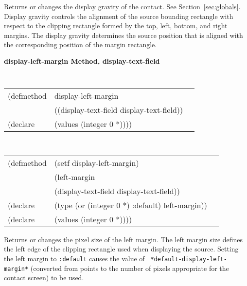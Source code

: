 \begin{flushright} \parbox[t]{6.125in}{
Returns or changes the display gravity of the contact.
See Section~\ref{sec:globals}. Display gravity controls the alignment of the
source bounding rectangle with respect to the clipping rectangle formed by the
top, left, bottom, and right margins. The display gravity determines the source
position that is aligned with the corresponding position of the margin
rectangle.  
} \end{flushright}

{\samepage  
{\large {\bf display-left-margin \hfill Method, display-text-field}}
\begin{flushright} \parbox[t]{6.125in}{
\tt
\begin{tabular}{lll}
\raggedright
(defmethod & display-left-margin & \\
& ((display-text-field  display-text-field)) \\
(declare & (values (integer 0 *))))
\end{tabular}
\rm

}\end{flushright}}

\begin{flushright} \parbox[t]{6.125in}{
\tt
\begin{tabular}{lll}
\raggedright
(defmethod & (setf display-left-margin) & \\
         & (left-margin \\
         & (display-text-field  display-text-field)) \\
(declare &(type (or (integer 0 *) :default)  left-margin))\\
(declare & (values (integer 0 *))))
\end{tabular}
\rm}
\end{flushright}

\begin{flushright} \parbox[t]{6.125in}{
Returns or changes the pixel size of the
left margin.  The left margin size defines
the left edge of the clipping rectangle used when displaying the source.
Setting the left margin to {\tt :default} causes the value of {\tt
*default-display-left-margin*} (converted from points to the number of pixels
appropriate for the contact screen) to be used.
}
\end{flushright}




